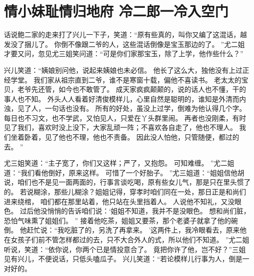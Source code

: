 \chapter{情小妹耻情归地府 \quad 冷二郎一冷入空门}
\par
话说鲍二家的走来打了兴儿一下子，笑道：“原有些真的，叫你又编了这混话，越发没了捆儿了。
你倒不像跟二爷的人，这些混话倒像是宝玉那边的了。
”尤二姐才要又问，忽见尤三姐笑问道：“可是你们家那宝玉，除了上学，他作些什么？”\par
兴儿笑道：“姨娘别问他，说起来姨娘也未必信。
他长了这么大，独他没有上过正经学堂。
我们家从祖宗直到二爷，谁不是寒窗十载，偏他不喜读书。
老太太的宝贝，老爷先还管，如今也不敢管了。
成天家疯疯颠颠的，说的话人也不懂，干的事人也不知。
外头人人看着好清俊模样儿，心里自然是聪明的，谁知是外清而内浊，见了人，一句话也没有。
所有的好处，虽没上过学，倒难为他认得几个字。
每日也不习文，也不学武，又怕见人，只爱在丫头群里闹。
再者也没刚柔，有时见了我们，喜欢时没上没下，大家乱顽一阵；不喜欢各自走了，他也不理人。
我们坐着卧着，见了他也不理，他也不责备。
因此没人怕他，只管随便，都过的去。
”\par
尤三姐笑道：“主子宽了，你们又这样；严了，又抱怨。
可知难缠。
”尤二姐道：“我们看他倒好，原来这样。
可惜了一个好胎子。
”尤三姐道：“姐姐信他胡说，咱们也不是见一面两面的，行事言谈吃喝，原有些女儿气，那是只在里头惯了的。
若说糊涂，那些儿糊涂？姐姐记得，穿孝时咱们同在一处，那日正是和尚们进来绕棺，
咱们都在那里站着，他只站在头里挡着人。
人说他不知礼，又没眼色。
过后他没悄悄的告诉咱们说：‘姐姐不知道，我并不是没眼色。
想和尚们脏，恐怕气味熏了姐姐们。
”
接着他吃茶，姐姐又要茶，那个老婆子就拿了他的碗倒。
他赶忙说：“我吃脏了的，另洗了再拿来。
’这两件上，我冷眼看去，原来他在女孩子们前不管怎样都过的去，只不大合外人的式，所以他们不知道。
”尤二姐听说，笑道：“依你说，你两个已是情投意合了。
竟把你许了他，岂不好？”三姐见有兴儿，不便说话，只低头嗑瓜子。
兴儿笑道：“若论模样儿行事为人，倒是一对好的。
